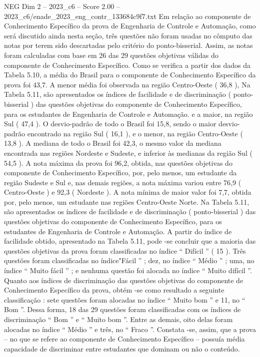 \begin{textsample}{NEG Dim 2 – 2023\_c6 – Score 2.00 – 2023\_c6/enade\_2023\_eng\_contr\_133684c9f7.txt}
Em relação ao componente de Conhecimento Específico da prova de Engenharia de Controle e Automação, como será discutido ainda nesta seção, três questões não foram usadas no cômputo das notas por terem sido descartadas pelo critério do ponto-bisserial.
Assim, as notas foram calculadas com base em 26 das 29 questões objetivas válidas do componente de Conhecimento Específico.
Como se verifica a partir dos dados da Tabela 5.10, a média do Brasil para o componente de Conhecimento Específico da prova foi 43,7.
A menor média foi observada na região Centro-Oeste ( 36,8 ), Na Tabela 5.11, são apresentados os índices de facilidade e de discriminação ( ponto-bisserial ) das questões objetivas do componente de Conhecimento Específico, para os estudantes de Engenharia de Controle e Automação. e a maior, na região Sul ( 47,4 ).
O desvio-padrão de todo o Brasil foi 15,8, sendo o maior desvio-padrão encontrado na região Sul ( 16,1 ), e o menor, na região Centro-Oeste ( 13,8 ).
A mediana de todo o Brasil foi 42,3, o mesmo valor da mediana encontrada nas regiões Nordeste e Sudeste, e inferior às medianas da região Sul ( 54,5 ).
A nota máxima da prova foi 96,2, obtida, nas questões objetivas do componente de Conhecimento Específico, por, pelo menos, um estudante da região Sudeste e Sul e, nas demais regiões, a nota máxima variou entre 76,9 ( Centro-Oeste ) e 92,3 ( Nordeste ).
A nota mínima de maior valor foi 7,7, obtida por, pelo menos, um estudante nas regiões Centro-Oeste Norte.
Na Tabela 5.11, são apresentados os índices de facilidade e de discriminação ( ponto-bisserial ) das questões objetivas do componente de Conhecimento Específico, para os estudantes de Engenharia de Controle e Automação.
A partir do índice de facilidade obtido, apresentado na Tabela 5.11, pode -se concluir que a maioria das questões objetivas da prova foram classificadas no índice “ Difícil ” ( 15 ).
Três questões foram classificadas no índice"Fácil ” ; dez, no índice “ Médio ” ; uma, no índice “ Muito fácil ” ; e nenhuma questão foi alocada no índice “ Muito difícil ”.
Quanto aos índices de discriminação das questões objetivas do componente de Conhecimento Específico da prova, obtém -se como resultado a seguinte classificação : sete questões foram alocadas no índice “ Muito bom ” e 11, no “ Bom ”.
Dessa forma, 18 das 29 questões foram classificadas com os índices de discriminação “ Bom ” e “ Muito bom ”.
Entre as demais, oito delas foram alocadas no índice “ Médio ” e três, no “ Fraco ”.
Constata -se, assim, que a prova – no que se refere ao componente de Conhecimento Específico – possuía média capacidade de discriminar entre estudantes que dominam ou não o conteúdo.

\end{textsample}
